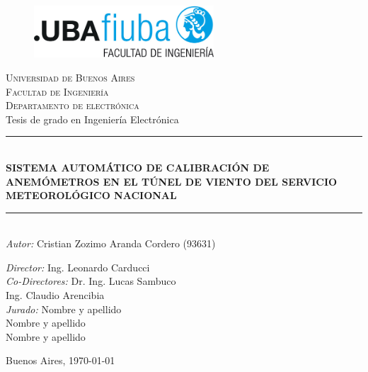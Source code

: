 \begin{titlepage}
\newcommand{\HRule}{\rule{\linewidth}{0.5mm}} 
\center 
\begin{figure}[H]
\centering
\includegraphics[width=0.6\textwidth]{fiuba_logo.jpg}
\end{figure}
\textsc{\large Universidad de Buenos Aires}\\[0.1cm] 
\textsc{\large Facultad de Ingeniería}\\[0.1cm]
\textsc{\large Departamento de electrónica}\\[1cm]

{\LARGE Tesis de grado en Ingeniería Electrónica} \\[0.1cm]

\HRule \\[0.1cm]
{\LARGE \bfseries SISTEMA AUTOMÁTICO DE CALIBRACIÓN DE ANEMÓMETROS EN EL TÚNEL DE VIENTO DEL SERVICIO METEOROLÓGICO NACIONAL}\\
\HRule \\[0.1cm]

\Large \emph{Autor:} \Large Cristian Zozimo Aranda Cordero (93631) \\[0.1cm]
\begin{flushleft}
\Large \emph{Director:} \Large Ing. Leonardo Carducci \\[0.1cm]
\Large \emph{Co-Directores:} \Large  Dr. Ing. Lucas Sambuco \\
\hspace{3.6cm} \Large  Ing. Claudio Arencibia\\[0.5cm]
\Large \emph{Jurado:} \Large  Nombre y apellido \\
\hspace{2.1cm}\Large  Nombre y apellido\\
\hspace{2.1cm}\Large  Nombre y apellido\\[1cm] 
\end{flushleft}
\large  Buenos Aires, \today
\vfill 
\end{titlepage}
